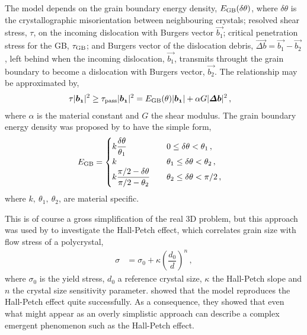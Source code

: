 The model depends on the grain boundary energy density, $ E_{\textrm{GB}}(\delta\theta) $, where $ \delta\theta $ is the crystallographic misorientation between neighbouring crystals; resolved shear stress, $ \tau $, on the incoming dislocation with Burgers vector $ \vec{b_{1}} $; critical penetration stress for the GB, $ \tau_{\textrm{GB}} $; and Burgers vector of the dislocation debris, $ \vec{\Delta b} = \vec{b_{1}} - \vec{b_{2}} $, left behind when the incoming dislocation, $ \vec{b_{1}} $, transmits throught the grain boundary to become a dislocation with Burgers vector, $ \vec{b_{2}} $. The relationship may be approximated by,
\begin{align}\label{eq:dln_trns}
	\tau \lvert\vec{b_{1}}\rvert^{2} & \geq \tau_{\rvar{pass}} \lvert\vec{b_{1}}\rvert^{2} = E_{\rvar{GB}}(\theta) \lvert\vec{b_{1}}\rvert + \alpha G \lvert\vec{\Delta b}\rvert^{2}\,,
\end{align}
where $ \alpha $ is the material constant and $ G $ the shear modulus. The grain boundary energy density was proposed by \cite{gb_e_dens} to have the simple form,
\begin{align}
	E_{\textrm{GB}} & = 	\begin{cases}
		k \dfrac{\delta\theta}{\theta_{1}}                 & \quad 0 \leq \delta\theta < \theta_{1}\,,          \\
		k                                                  & \quad \theta_{1} \leq \delta\theta < \theta_{2}\,, \\
		k \dfrac{\pi/2 - \delta\theta}{\pi/2 - \theta_{2}} & \quad \theta_{2} \leq \delta\theta < \pi/2\,,
	\end{cases}
\end{align}
where $ k,~ \theta_{1},~\theta_{2} $, are material specific.

This is of course a gross simplification of the real 3D problem, but this approach was used by \citet{2d_pcm} to investigate the Hall-Petch effect, which correlates grain size with flow stress of a polycrystal,
\begin{align}\label{eq:hall_petch}
	\sigma & = \sigma_{0} + \kappa \left(\dfrac{d_{0}}{d}\right)^{n}\,,
\end{align}
where $ \sigma_{0} $ is the yield stress, $ d_{0} $ a reference crystal size, $ \kappa $ the Hall-Petch slope and $ n $ the crystal size sensitivity parameter.  showed that the model reproduces the Hall-Petch effect quite successfully. As a consequence, they showed that even what might appear as an overly simplistic approach can describe a complex emergent phenomenon such as the Hall-Petch effect.

